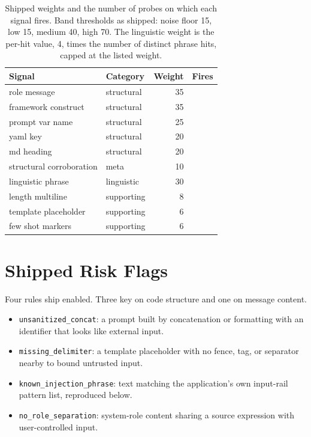 \documentclass[conference]{IEEEtran}
\begin{document}
\begin{table}[h]
\centering
\footnotesize
\begin{tabular}{llrl}
\toprule
Signal & Category & Weight & Fires \\
\midrule
role message & structural & 35 & \Firesrolemessage{} \\
framework construct & structural & 35 & \Firesframeworkconstruct{} \\
prompt var name & structural & 25 & \Firespromptvarname{} \\
yaml key & structural & 20 & \Firesyamlkey{} \\
md heading & structural & 20 & \Firesmdheading{} \\
structural corroboration & meta & 10 & \Firesstructuralcorroboration{} \\
linguistic phrase & linguistic & 30 & \Fireslinguisticphrase{} \\
length multiline & supporting & 8 & \Fireslengthmultiline{} \\
template placeholder & supporting & 6 & \Firestemplateplaceholder{} \\
few shot markers & supporting & 6 & \Firesfewshotmarkers{} \\
\bottomrule
\end{tabular}
\caption{Shipped weights and the number of probes on which each signal fires.
Band thresholds as shipped: noise floor 15, low 15, medium 40, high 70. The
linguistic weight is the per-hit value, 4, times the number of distinct phrase
hits, capped at the listed weight.}
\label{tab:signalweights}
\end{table}

\section{Shipped Risk Flags}\label{app:flags}

Four rules ship enabled. Three key on code structure and one on message
content.

\begin{itemize}
\item \texttt{unsanitized\_concat}: a prompt built by concatenation or
  formatting with an identifier that looks like external input.
\item \texttt{missing\_delimiter}: a template placeholder with no fence, tag,
  or separator nearby to bound untrusted input.
\item \texttt{known\_injection\_phrase}: text matching the application's own
  input-rail pattern list, reproduced below.
\item \texttt{no\_role\_separation}: system-role content sharing a source
  expression with user-controlled input.
\end{itemize}
\end{document}
